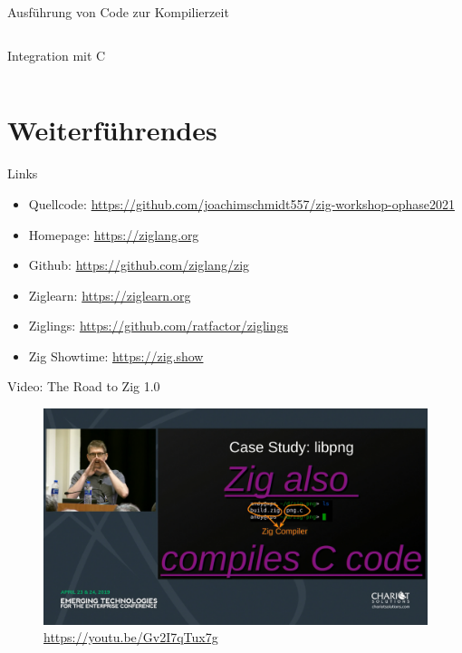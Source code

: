 \documentclass[aspectratio=169]{beamer}
\begin{document}
\begin{frame}{Ausführung von Code zur Kompilierzeit}
  \inputminted[linenos, fontsize=\small]{zig}{examples/comptime.zig}
\end{frame}

\begin{frame}{Integration mit C}
  \inputminted[linenos, fontsize=\small]{zig}{examples/c_integration.zig}
\end{frame}

\section{Weiterführendes}

\begin{frame}{Links}
  \begin{itemize}
  \item Quellcode: \url{https://github.com/joachimschmidt557/zig-workshop-ophase2021}
  \item Homepage: \url{https://ziglang.org}
  \item Github: \url{https://github.com/ziglang/zig}
  \item Ziglearn: \url{https://ziglearn.org}
  \item Ziglings: \url{https://github.com/ratfactor/ziglings}
  \item Zig Showtime: \url{https://zig.show}
  \end{itemize}
\end{frame}

\begin{frame}{Video: The Road to Zig 1.0}
  \begin{figure}
    \centering
    \includegraphics[height=0.8\textheight]{img/mpv-shot0002.jpg}
    \caption{\url{https://youtu.be/Gv2I7qTux7g}}
    \label{fig:road-zig-1-0}
  \end{figure}
\end{frame}
\end{document}
